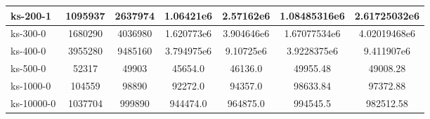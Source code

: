 \documentclass{report}
\begin{document}
\begin{tabular}{l|c|c|c|c|c|c}
        \hline
        ks-200-1 & 1095937 & 2637974 & 1.06421e6 & 2.57162e6 & 1.08485316e6 & 2.61725032e6\\
        \hline
        ks-300-0 & 1680290 & 4036980 & 1.620773e6 & 3.904646e6 & 1.67077534e6 & 4.02019468e6\\
        \hline
        ks-400-0 & 3955280 & 9485160 & 3.794975e6 & 9.10725e6 & 3.9228375e6 & 9.411907e6\\
        \hline
        ks-500-0 & 52317 & 49903 & 45654.0 & 46136.0 & 49955.48 & 49008.28\\
        \hline
        ks-1000-0 & 104559 & 98890 & 92272.0 & 94357.0 & 98633.84 & 97372.88\\
        \hline
        ks-10000-0 & 1037704 & 999890 & 944474.0 & 964875.0 & 994545.5 & 982512.58               
        
    \end{tabular}
\end{document}
